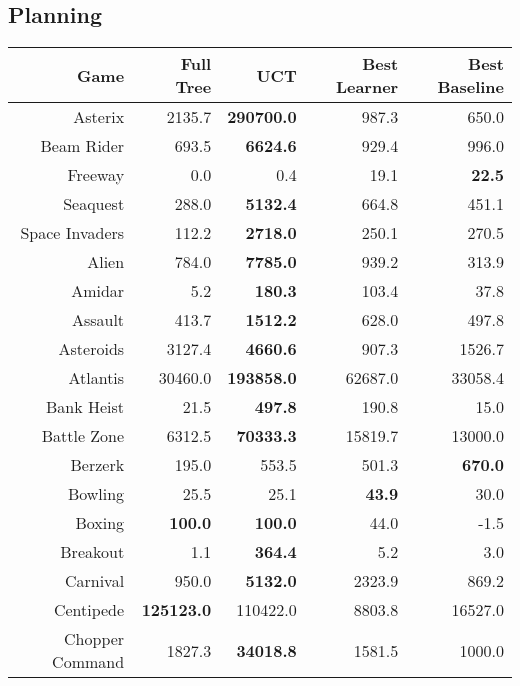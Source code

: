 \documentclass[twoside,11pt]{article}
\newcommand{\gamename}[1]{{\sc #1}}
\begin{document}
\newpage
\subsection{Planning}
\begin{table}[h!]
\tiny
\begin{center}
\clearpage{}\begin{tabular}{|r|r|r|r|r|}
\hline
Game & Full Tree & UCT & Best Learner & Best Baseline \\ 
\hline
\hline
\gamename{Asterix} & 2135.7& \textbf { 290700.0 }& 987.3& 650.0\\
\hline
\gamename{Beam Rider} & 693.5& \textbf { 6624.6 }& 929.4& 996.0\\
\hline
\gamename{Freeway} & 0.0& 0.4& 19.1& \textbf { 22.5 }\\
\hline
\gamename{Seaquest} & 288.0& \textbf { 5132.4 }& 664.8& 451.1\\
\hline
\gamename{Space Invaders} & 112.2& \textbf { 2718.0 }& 250.1& 270.5\\
\hline
\hline
\gamename{Alien} & 784.0& \textbf { 7785.0 }& 939.2& 313.9\\
\hline
\gamename{Amidar} & 5.2& \textbf { 180.3 }& 103.4& 37.8\\
\hline
\gamename{Assault} & 413.7& \textbf { 1512.2 }& 628.0& 497.8\\
\hline
\gamename{Asteroids} & 3127.4& \textbf { 4660.6 }& 907.3& 1526.7\\
\hline
\gamename{Atlantis} & 30460.0& \textbf { 193858.0 }& 62687.0& 33058.4\\
\hline
\gamename{Bank Heist} & 21.5& \textbf { 497.8 }& 190.8& 15.0\\
\hline
\gamename{Battle Zone} & 6312.5& \textbf { 70333.3 }& 15819.7& 13000.0\\
\hline
\gamename{Berzerk} & 195.0& 553.5& 501.3& \textbf { 670.0 }\\
\hline
\gamename{Bowling} & 25.5& 25.1& \textbf { 43.9 }& 30.0\\
\hline
\gamename{Boxing} & \textbf { 100.0 }& \textbf{100.0 } & 44.0& -1.5\\
\hline
\gamename{Breakout} & 1.1& \textbf { 364.4 }& 5.2& 3.0\\
\hline
\gamename{Carnival} & 950.0& \textbf { 5132.0 }& 2323.9& 869.2\\
\hline
\gamename{Centipede} & \textbf { 125123.0 }& 110422.0& 8803.8& 16527.0\\
\hline
\gamename{Chopper Command} & 1827.3& \textbf { 34018.8 }& 1581.5& 1000.0\\

\end{tabular}
\end{center}
\end{table}
\end{document}
